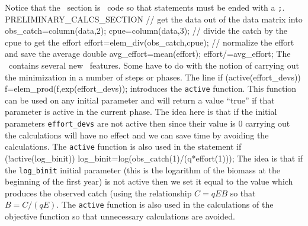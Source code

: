 \documentclass[12pt]{book}
\begin{document}
Notice that the \PCS\ section is \cplus\ code so that statements 
must be ended with a {\tt ;}.
\beginexample
PRELIMINARY_CALCS_SECTION
  // get the data out of the data matrix into 
  obs_catch=column(data,2);  
  cpue=column(data,3);  
  // divide the catch by the cpue to get the effort
  effort=elem_div(obs_catch,cpue);
  // normalize the effort and save the average
  double avg_effort=mean(effort);
  effort/=avg_effort;
\endexample
The \PROS\ contains several new \ADM\ features. Some have to do with
the notion of carrying out the minimization in a number of steps
or phases. The line
\beginexample
  if (active(effort_devs)) f=elem_prod(f,exp(effort_devs));
\endexample
{}
introduces the {\tt active} function. This function can be used on
any initial parameter and will return a value ``true'' if
that parameter is active in the current phase. The idea here is that
if the initial parameters {\tt effort\_devs} are not active then
since their value is 0 carrying out the calculations will have no
effect and we can save time by avoiding the calculations. 
The {\tt active} function is also used in the statement
\beginexample
  if (!active(log_binit))
  {
    log_binit=log(obs_catch(1)/(q*effort(1)));
  }
\endexample
The idea is that if the {\tt log\_binit} initial parameter 
(this is the logarithm of the biomass  at the beginning of the first year)
is not active then we set it equal to the value which produces the
observed catch (using the relationship $C=qEB$ so that 
$B=C/(qE)$. 
The {\tt active} function is also used in the calculations of
the objective function so that unnecessary calculations are
avoided.
\end{document}
